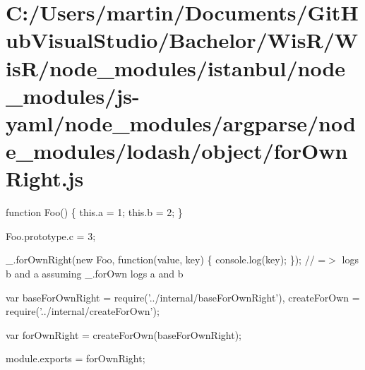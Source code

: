 \hypertarget{_c_1_2_users_2martin_2_documents_2_git_hub_visual_studio_2_bachelor_2_wis_r_2_wis_r_2node_module4ece162061f12ae26da3fefeda1fa450}{}\section{C\+:/\+Users/martin/\+Documents/\+Git\+Hub\+Visual\+Studio/\+Bachelor/\+Wis\+R/\+Wis\+R/node\+\_\+modules/istanbul/node\+\_\+modules/js-\/yaml/node\+\_\+modules/argparse/node\+\_\+modules/lodash/object/for\+Own\+Right.\+js}
function Foo() \{ this.\+a = 1; this.\+b = 2; \}

Foo.\+prototype.\+c = 3;

\+\_\+.\+for\+Own\+Right(new Foo, function(value, key) \{ console.\+log(key); \}); // =$>$ logs \textquotesingle{}b\textquotesingle{} and \textquotesingle{}a\textquotesingle{} assuming {\ttfamily \+\_\+.\+for\+Own} logs \textquotesingle{}a\textquotesingle{} and \textquotesingle{}b\textquotesingle{}


\begin{DoxyCodeInclude}
var baseForOwnRight = require(\textcolor{stringliteral}{'../internal/baseForOwnRight'}),
    createForOwn = require(\textcolor{stringliteral}{'../internal/createForOwn'});

var forOwnRight = createForOwn(baseForOwnRight);

module.exports = forOwnRight;
\end{DoxyCodeInclude}
 